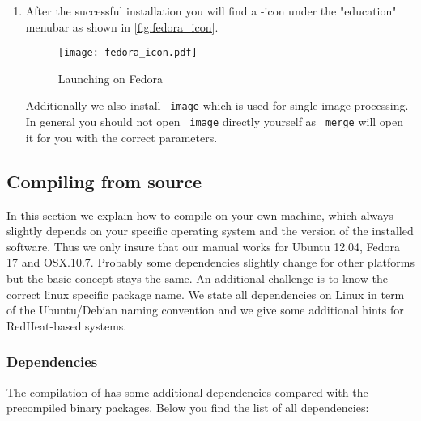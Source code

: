 \begin{enumerate}
	\item After the successful installation you will find a {\twodx}-icon under the "education" menubar as shown in \autoref{fig:fedora_icon}.
	
	\begin{figure}[H]
		\centering
		\texttt{[image: fedora\_icon.pdf]}
		\caption{Launching {\twodx} on Fedora}
		\label{fig:fedora_icon}
	\end{figure}
	
	Additionally we also install {\twodx}\texttt{\_image} which is used for single image processing. In general you should not open {\twodx}\texttt{\_image} directly yourself as {\twodx}\texttt{\_merge} will open it for you with the correct parameters.
	
\end{enumerate}

\newpage

\subsection{Compiling from source}
\label{sec:install_source}
In this section we explain how to compile {\twodx} on your own machine, which always slightly depends on your specific operating system and the version of the installed software. Thus we only insure that our manual works for Ubuntu 12.04, Fedora 17 and OSX.10.7. Probably some dependencies slightly change for other platforms but the basic concept stays the same. An additional challenge is to know the correct linux specific package name. We state all dependencies on Linux in term of the Ubuntu/Debian naming convention and we give some additional hints for RedHeat-based systems.

\subsubsection{Dependencies}
The compilation of {\twodx} has some additional dependencies compared with the precompiled binary packages. Below you find the list of all dependencies:

